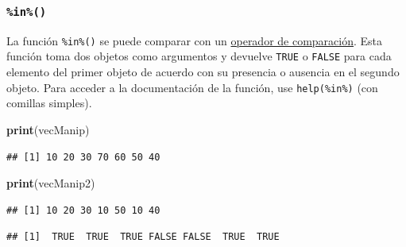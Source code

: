 \documentclass[
]{book}
\newenvironment{Shaded}{\begin{snugshade}}{\end{snugshade}}
\newcommand{\KeywordTok}[1]{\textcolor[rgb]{0.13,0.29,0.53}{\textbf{#1}}}
\newcommand{\NormalTok}[1]{#1}
\newcommand{\OperatorTok}[1]{\textcolor[rgb]{0.81,0.36,0.00}{\textbf{#1}}}
\newcommand{\StringTok}[1]{\textcolor[rgb]{0.31,0.60,0.02}{#1}}
\begin{document}
\hypertarget{l015in}{%
\subsubsection{\texorpdfstring{\texttt{\%in\%()}}{\%in\%()}}\label{l015in}}

La función \texttt{\%in\%()} se puede comparar con un \protect\hyperlink{l011opcomp}{operador de comparación}. Esta función toma dos objetos como argumentos y devuelve \texttt{TRUE} o \texttt{FALSE} para cada elemento del primer objeto de acuerdo con su presencia o ausencia en el segundo objeto. Para acceder a la documentación de la función, use \texttt{help(\textquotesingle{}\%in\%\textquotesingle{})} (con comillas simples).

\begin{Shaded}
\begin{Highlighting}[]
\KeywordTok{print}\NormalTok{(vecManip)}
\end{Highlighting}
\end{Shaded}

\begin{verbatim}
## [1] 10 20 30 70 60 50 40
\end{verbatim}

\begin{Shaded}
\begin{Highlighting}[]
\KeywordTok{print}\NormalTok{(vecManip2)}
\end{Highlighting}
\end{Shaded}

\begin{verbatim}
## [1] 10 20 30 10 50 10 40
\end{verbatim}

\begin{Shaded}
\end{Shaded}

\begin{verbatim}
## [1]  TRUE  TRUE  TRUE FALSE FALSE  TRUE  TRUE
\end{verbatim}

\begin{Shaded}
\end{Shaded}
\end{document}
